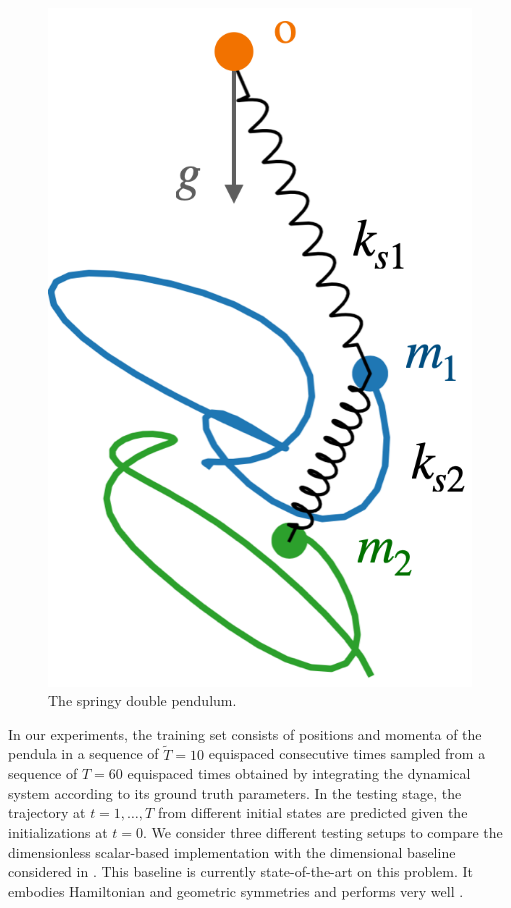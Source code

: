 \documentclass[twoside,11pt]{article}
\begin{document}
\begin{figure}[t]
    \centering
    \includegraphics[scale=0.15]{imgs/dp_system.png}
    \caption{The springy double pendulum.}
    \label{fig:dp_system}
\end{figure}

In our experiments, the training set consists of positions and momenta of the pendula in a sequence of $\tilde T=10$ equispaced consecutive times sampled from a sequence of $T=60$ equispaced times obtained by integrating the dynamical system according to its ground truth parameters. %
In the testing stage, the trajectory at $t=1,\ldots,T$ from different initial states are predicted given the initializations at $t=0$. We consider three different testing setups to compare the dimensionless scalar-based implementation with the dimensional baseline considered in \citet{yao}. This baseline is currently state-of-the-art on this problem. It embodies Hamiltonian and geometric symmetries and performs very well \citep{yao}.
\end{document}
